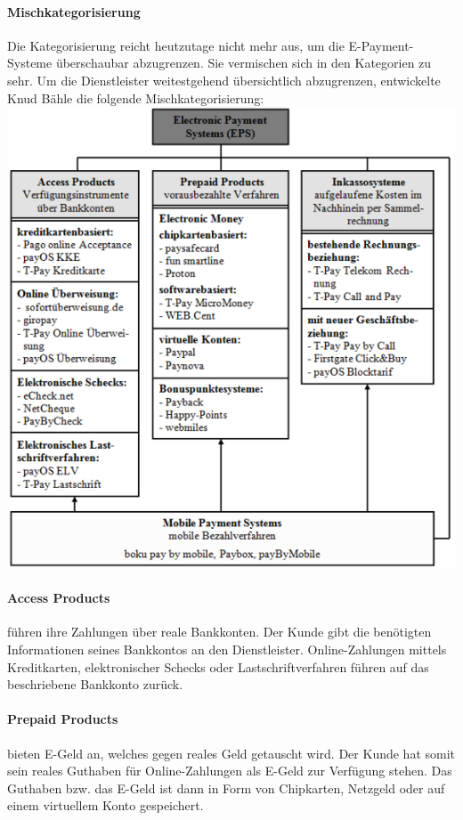 \paragraph{Mischkategorisierung}
Die Kategorisierung reicht heutzutage nicht mehr aus, um die E-Payment-Systeme überschaubar abzugrenzen. Sie vermischen sich in den Kategorien zu sehr. Um die Dienstleister weitestgehend über\-sichtlich abzugrenzen, entwickelte Knud Bähle die folgende Mischkategorisierung:
\\
\includegraphics[]{img/Mischform.png}

\paragraph{Access Products} führen ihre Zahlungen über reale Bankkonten. Der Kunde gibt die benötigten Informationen seines Bankkontos an den Dienstleister. Online-Zahlungen mittels Kreditkarten, elektronischer Schecks oder Lastschriftverfahren führen auf das beschriebene Bankkonto zurück.

\paragraph{Prepaid Products} bieten E-Geld an, welches gegen reales Geld getauscht wird. Der Kunde hat somit sein reales Guthaben für Online-Zahlungen als E-Geld zur Verfügung stehen. Das Guthaben bzw. das E-Geld ist dann in Form von Chipkarten, Netzgeld oder auf einem virtuellem Konto gespeichert.

